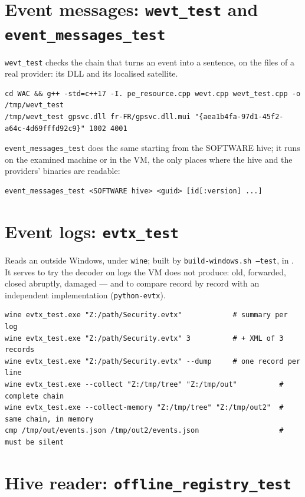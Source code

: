 \documentclass[11pt,a4paper,oneside]{report}
\begin{document}
\section{Event messages: \texttt{wevt\_test} and \texttt{event\_messages\_test}}

\texttt{wevt\_test} checks the chain that turns an event into a sentence, on the
files of a real provider: its DLL and its localised satellite.

\begin{lstlisting}
cd WAC && g++ -std=c++17 -I. pe_resource.cpp wevt.cpp wevt_test.cpp -o /tmp/wevt_test
/tmp/wevt_test gpsvc.dll fr-FR/gpsvc.dll.mui "{aea1b4fa-97d1-45f2-a64c-4d69fffd92c9}" 1002 4001
\end{lstlisting}

\texttt{event\_messages\_test} does the same starting from the SOFTWARE hive; it
runs on the examined machine or in the VM, the only places where the hive and
the providers' binaries are readable:

\begin{lstlisting}
event_messages_test <SOFTWARE hive> <guid> [id[:version] ...]
\end{lstlisting}

\section{Event logs: \texttt{evtx\_test}}

Reads an  outside Windows, under \texttt{wine}; built by
\texttt{build-windows.sh --test}, in . It serves to try
the decoder on logs the VM does not produce: old, forwarded, closed abruptly,
damaged — and to compare record by record with an independent implementation
(\texttt{python-evtx}).

\begin{lstlisting}
wine evtx_test.exe "Z:/path/Security.evtx"            # summary per log
wine evtx_test.exe "Z:/path/Security.evtx" 3          # + XML of 3 records
wine evtx_test.exe "Z:/path/Security.evtx" --dump     # one record per line
wine evtx_test.exe --collect "Z:/tmp/tree" "Z:/tmp/out"          # complete chain
wine evtx_test.exe --collect-memory "Z:/tmp/tree" "Z:/tmp/out2"  # same chain, in memory
cmp /tmp/out/events.json /tmp/out2/events.json                   # must be silent
\end{lstlisting}


\section{Hive reader: \texttt{offline\_registry\_test}}
\end{document}
